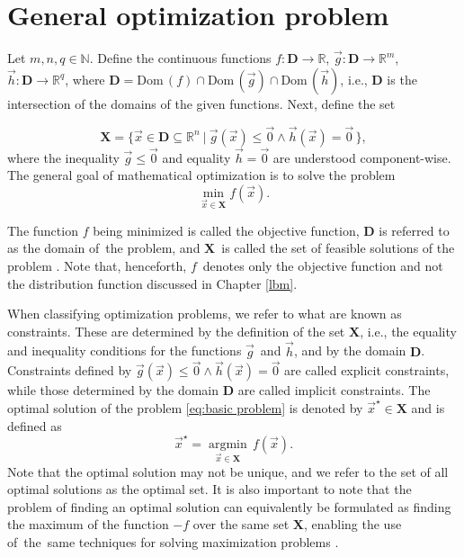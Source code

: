 \section{General optimization problem}

Let $m, n, q \in \mathbb{N}$. Define the continuous functions $f : \mathbf{D} \rightarrow \mathbb{R}$, $ \vec{g} : \mathbf{D} \rightarrow \mathbb{R}^m$, $ \vec{h} : \mathbf{D} \rightarrow \mathbb{R}^q $, where $ \mathbf{D} = \mathrm{Dom} \, (f) \cap \mathrm{Dom} \, (\vec{g}) \cap \mathrm{Dom} \, (\vec{h})$, i.e., $ \mathbf{D} $ is the intersection of the domains of the given functions. Next, define the set

\begin{equation}\label{eq:feasible solution}
	\mathbf{X} = \big\{ \vec{x} \in \mathbf{D} \subseteq \mathbb{R}^n \ | \ \vec{g} (\vec{x}) \leq \vec{0} \wedge \vec{h} (\vec{x}) = \vec{0} \, \big\},
\end{equation}
where the inequality $ \vec{g} \leq \vec{0} $ and equality $ \vec{h} = \vec{0} $ are understood component-wise. The general goal of mathematical optimization is to solve the problem
\begin{equation}\label{eq:basic problem}
	\min_{\vec{x} \in \mathbf{X}} f(\vec{x}).
\end{equation}

The function $f$ being minimized is called the objective function, $\mathbf{D}$ is referred to as the domain of~the problem, and $\mathbf{X}$~is called the set of feasible solutions of the problem \cite{Bert}. Note that, henceforth, $f$~denotes only the objective function and not the distribution function discussed in Chapter \ref{lbm}.

When classifying optimization problems, we refer to what are known as constraints. These are determined by the definition of the set $ \mathbf{X} $, i.e., the equality and inequality conditions for the functions $ \vec{g} $~and $ \vec{h} $, and by the domain $ \mathbf{D} $. Constraints defined by $ \vec{g} (\vec{x}) \leq \vec{0} \wedge \vec{h} (\vec{x}) = \vec{0} $ are called explicit constraints, while those determined by the domain $ \mathbf{D} $ are called implicit constraints.
\newpage
The optimal solution of the problem \eqref{eq:basic problem} is denoted by $ \vec{x}^{\star} \in \mathbf{X} $ and is defined as
\begin{equation}
	\vec{x}^{\star} = \operatorname*{argmin}_{\vec{x} \in \mathbf{X}} \, f(\vec{x}).
\end{equation}
Note that the optimal solution may not be unique, and we refer to the set of all optimal solutions as the optimal set. It is also important to note that the problem of finding an optimal solution can equivalently be formulated as finding the maximum of the function $ -f$ over the same set $ \mathbf{X}$, enabling the use of~the~same techniques for solving maximization problems \cite{Bert, non-linear-textbook}.